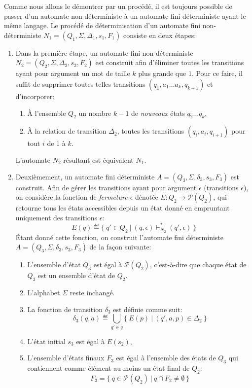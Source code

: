 Comme nous allons le démontrer par un procédé, il est toujours possible de passer d'un automate non-déterministe à un automate fini déterministe ayant le même langage.
Le procédé de \og déterminisation \fg{} d'un automate fini non-déterministe $N_1 = (Q_1, \Sigma, \Delta_1, s_1, F_1)$ consiste en deux étapes:
\begin{enumerate}
\item
Dans la première étape, un automate fini non-déterministe $N_2 = (Q_2, \Sigma, \Delta_2, s_2, F_2)$  est construit afin d'éliminer toutes les transitions ayant pour argument un mot de taille $k$ plus grande que $1$. Pour ce faire, il suffit de supprimer toutes telles transitions $(q_1, a_1 \dots a_k, q_{k+1})$ et d'incorporer:
\begin{enumerate}
\item À l'ensemble $Q_2$ un nombre $k-1$ de \textit{nouveaux} états $q_2 \dots q_k$,
\item À la relation de transition $\Delta_2$, toutes les transitions $(q_i, a_i, q_{i+1})$ pour tout $i$ de $1$ à $k$.
\end{enumerate}
L'automate $N_2$ résultant est équivalent $N_1$.
\item
Deuxièmement, un automate fini déterministe $A = (Q_3, \Sigma, \delta_3, s_3, F_3)$  est construit.
Afin de gérer les transitions ayant pour argument $\epsilon$ (transitions $\epsilon$), on considère la fonction de \og \textit{fermeture-$\epsilon$} \fg{} dénotée $E : Q_2 \to \mathcal{P}(Q_2)$, qui retourne tous les états accessibles depuis un état donné en empruntant uniquement des transitions $\epsilon$:
\[
E(q) \eqdef \{\ q' \in Q_2\ |\ (q, \epsilon) \vdash_{N_2}^* (q', \epsilon)\ \} 
\]
Étant donné cette fonction, on construit l'automate fini déterministe $A = (Q_3, \Sigma, \delta_3, s_3, F_3)$ de la façon suivante:
\begin{enumerate}
\item L'ensemble d'état $Q_3$ est égal à $\mathcal{P}(Q_2)$, c'est-à-dire que chaque état de $Q_3$ est un ensemble d'état de $Q_2$.
\item L'alphabet $\Sigma$ reste inchangé.
\item La fonction de transition $\delta_3$ est définie comme suit:
\[
\delta_3(q, a) \eqdef \bigcup_{q' \in q} \{\ E(p)\ |\ (q', a, p) \in \Delta_2\ \}
\]
\item L'état initial $s_3$ est égal à $E(s_2)$,
\item L'ensemble d'états finaux $F_3$ est égal à l'ensemble des états de $Q_3$ qui contiennent comme élément au moins un état final de $Q_2$:
\[
F_3 = \{\ q \in \mathcal{P}(Q_2)\ |\ q \cap F_2 \neq \emptyset\ \}
\] 
\end{enumerate}
\end{enumerate}

